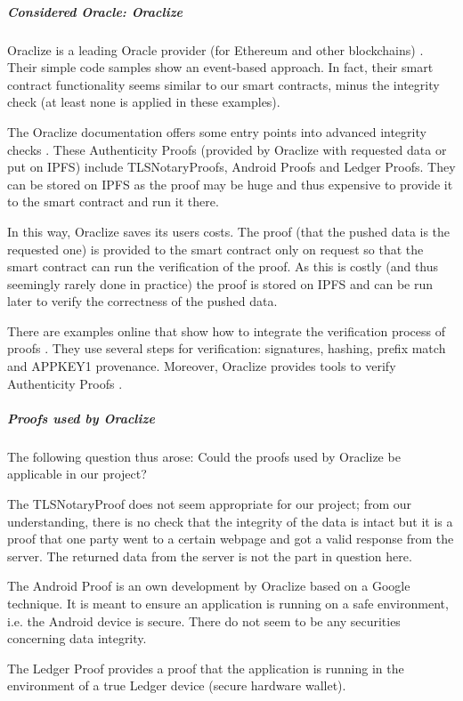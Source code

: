 \subparagraph{Considered Oracle: Oraclize}
Oraclize is a leading Oracle provider (for Ethereum and other blockchains) \cite{relatedWork02}. Their simple code samples \cite{relatedWork03} show an event-based approach. In fact, their smart contract functionality seems similar to our smart contracts, minus the integrity check (at least none is applied in these examples).

The Oraclize documentation offers some entry points into advanced integrity checks \cite{relatedWork04}. These Authenticity Proofs (provided by Oraclize with requested data or put on IPFS) \cite{relatedWork05} include TLSNotaryProofs, Android Proofs and Ledger Proofs. They can be stored on IPFS as the proof may be huge and thus expensive to provide it to the smart contract and run it there. \cite{relatedWork06}

In this way, Oraclize saves its users costs. The proof (that the pushed data is the requested one) is provided to the smart contract only on request so that the smart contract can run the verification of the proof. As this is costly (and thus seemingly rarely done in practice) the proof is stored on IPFS and can be run later to verify the correctness of the pushed data.

There are examples online that show how to integrate the verification process of proofs \cite{relatedWork07}. They use several steps for verification: signatures, hashing, prefix match and APPKEY1 provenance. Moreover, Oraclize provides tools to verify Authenticity Proofs \cite{relatedWork08, relatedWork09}.

\subparagraph{Proofs used by Oraclize}
The following question thus arose: Could the proofs used by Oraclize be applicable in our project?

The TLSNotaryProof \cite{relatedWork10, relatedWork11, relatedWork12} does not seem appropriate for our project; from our understanding, there is no check that the integrity of the data is intact but it is a proof that one party went to a certain webpage and got a valid response from the server. The returned data from the server is not the part in question here.

The Android Proof \cite{relatedWork13} is an own development by Oraclize based on a Google technique. It is meant to ensure an application is running on a safe environment, i.e. the Android device is secure. There do not seem to be any securities concerning data integrity.

The Ledger Proof \cite{relatedWork14, relatedWork15} provides a proof that the application is running in the environment of a true Ledger device (secure hardware wallet).


